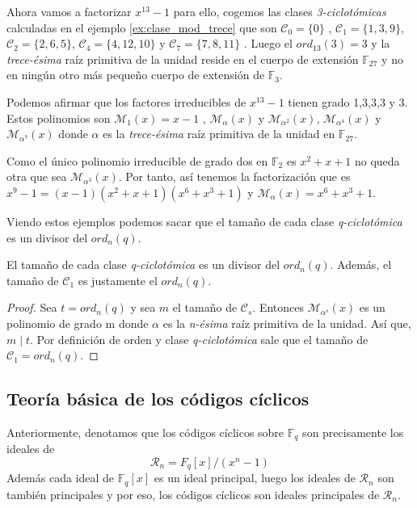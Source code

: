 \begin{exampleth}
Ahora vamos a factorizar $x^13-1$ para ello, cogemos las clases \textit{3-ciclotómicas} calculadas en el ejemplo \ref{ex:clase_mod_trece} que son $\mathcal{C}_0 = \{ 0 \}$ , $\mathcal{C}_1 = \{ 1,3,9 \}$, $\mathcal{C}_2 = \{ 2,6,5 \}$,  $\mathcal{C}_4 = \{ 4,12,10 \}$ y  $\mathcal{C}_7 = \{ 7,8,11 \}$ . Luego el $ord_13(3) = 3$ y la \textit{trece-ésima} raíz primitiva de la unidad reside en el cuerpo de extensión $\mathbb{F}_{27}$ y no en ningún otro más pequeño cuerpo de extensión de $\mathbb{F}_3$.

Podemos afirmar que los factores irreducibles de $x^13-1$ tienen grado 1,3,3,3 y 3. Estos polinomios son $\mathcal{M}_{1}(x) = x -1 $ , $\mathcal{M}_{\alpha}(x)$ y $\mathcal{M}_{\alpha^2}(x)$,  $\mathcal{M}_{\alpha^4}(x)$ y  $\mathcal{M}_{\alpha^7}(x)$ donde $\alpha$ es la \textit{trece-ésima} raíz primitiva de la unidad en $\mathbb{F}_{27}$. 

Como el único polinomio irreducible de grado dos en $\mathbb{F}_2$ es $x^2+x+1$ no queda otra que sea $\mathcal{M}_{\alpha^3}(x)$. Por tanto, así tenemos la factorización que es $x^9-1 = (x-1)(x^2+x+1)(x^6+x^3+1)$ y $\mathcal{M}_{\alpha}(x) = x^6+x^3+1$.

\end{exampleth}
 
Viendo estos ejemplos podemos sacar que el tamaño de cada clase \textit{q-ciclotómica} es un divisor del $ord_n(q)$.

\begin{theorem}
El tamaño de cada clase \textit{q-ciclotómica} es un divisor del $ord_n(q)$. Además, el tamaño de $\mathcal{C}_1$ es justamente el  $ord_n(q)$.
\end{theorem}

\begin{proof}
Sea $t = ord_n(q)$ y sea $m$ el tamaño de $\mathcal{C}_s$. Entonces $\mathcal{M}_{\alpha^s}(x)$ es un polinomio de grado m donde $\alpha$ es la \textit{n-ésima} raíz primitiva de la unidad. Así que, $ m \mid t$. Por definición de orden y clase \textit{q-ciclotómica} sale que el tamaño de $\mathcal{C}_1 = ord_n(q) $.
\end{proof}


\subsection{Teoría básica de los códigos cíclicos}

Anteriormente, denotamos que los códigos cíclicos sobre $\mathbb{F}_q$ son precisamente los ideales de 
\[
\mathcal{R}_n = F_q[x]/(x^n-1)
\] 
Además cada ideal de $\mathbb{F}_q[x]$ es un ideal principal, luego los ideales de $\mathcal{R}_n$ son también principales y por eso, los códigos cíclicos son ideales principales de $\mathcal{R}_n$.

